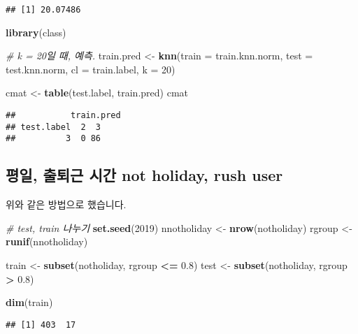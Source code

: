 \documentclass[]{article}
\newenvironment{Shaded}{\begin{snugshade}}{\end{snugshade}}
\newcommand{\KeywordTok}[1]{\textcolor[rgb]{0.13,0.29,0.53}{\textbf{#1}}}
\newcommand{\DataTypeTok}[1]{\textcolor[rgb]{0.13,0.29,0.53}{#1}}
\newcommand{\DecValTok}[1]{\textcolor[rgb]{0.00,0.00,0.81}{#1}}
\newcommand{\FloatTok}[1]{\textcolor[rgb]{0.00,0.00,0.81}{#1}}
\newcommand{\StringTok}[1]{\textcolor[rgb]{0.31,0.60,0.02}{#1}}
\newcommand{\CommentTok}[1]{\textcolor[rgb]{0.56,0.35,0.01}{\textit{#1}}}
\newcommand{\OperatorTok}[1]{\textcolor[rgb]{0.81,0.36,0.00}{\textbf{#1}}}
\newcommand{\NormalTok}[1]{#1}
\begin{document}
\begin{verbatim}
## [1] 20.07486
\end{verbatim}

\begin{Shaded}
\begin{Highlighting}[]
\KeywordTok{library}\NormalTok{(class)}

\CommentTok{# k = 20일 때, 예측.}
\NormalTok{train.pred <-}\StringTok{ }\KeywordTok{knn}\NormalTok{(}\DataTypeTok{train =}\NormalTok{ train.knn.norm, }\DataTypeTok{test =}\NormalTok{ test.knn.norm, }\DataTypeTok{cl =}\NormalTok{ train.label, }\DataTypeTok{k =} \DecValTok{20}\NormalTok{)}

\NormalTok{cmat <-}\StringTok{ }\KeywordTok{table}\NormalTok{(test.label, train.pred)}
\NormalTok{cmat}
\end{Highlighting}
\end{Shaded}

\begin{verbatim}
##           train.pred
## test.label  2  3
##          3  0 86
\end{verbatim}

\subsection{평일, 출퇴근 시간 not holiday, rush
user}\label{---not-holiday-rush-user}

위와 같은 방법으로 했습니다.

\begin{Shaded}
\begin{Highlighting}[]
\CommentTok{# test, train 나누기}
\KeywordTok{set.seed}\NormalTok{(}\DecValTok{2019}\NormalTok{)}
\NormalTok{nnotholiday <-}\StringTok{ }\KeywordTok{nrow}\NormalTok{(notholiday)}
\NormalTok{rgroup <-}\StringTok{ }\KeywordTok{runif}\NormalTok{(nnotholiday)}

\NormalTok{train <-}\StringTok{ }\KeywordTok{subset}\NormalTok{(notholiday, rgroup }\OperatorTok{<=}\StringTok{ }\FloatTok{0.8}\NormalTok{)}
\NormalTok{test <-}\StringTok{ }\KeywordTok{subset}\NormalTok{(notholiday, rgroup }\OperatorTok{>}\StringTok{ }\FloatTok{0.8}\NormalTok{)}

\KeywordTok{dim}\NormalTok{(train)}
\end{Highlighting}
\end{Shaded}

\begin{verbatim}
## [1] 403  17
\end{verbatim}
\end{document}
